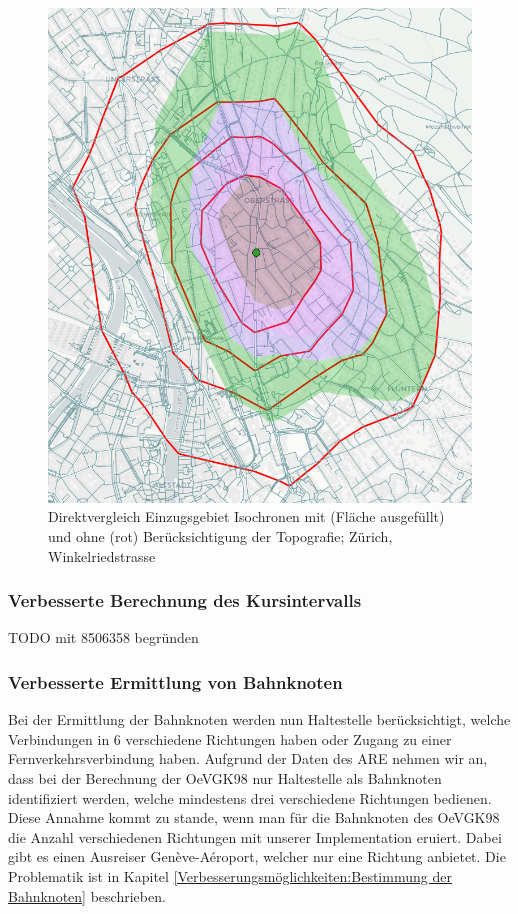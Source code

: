 \begin{figure}[ht]
    \centering
    \includegraphics[width=0.8\linewidth]{technicalreport/img/vergleich_wegfuehrung_isochrone_mit_ohne_topo.png}
    \caption[Direktvergleich Einzugsgebiet Isochronen mit und ohne Topografie]{Direktvergleich Einzugsgebiet Isochronen mit (Fläche ausgefüllt) und ohne (rot) Berücksichtigung der Topografie; Zürich, Winkelriedstrasse}
    \label{fig:vergleich_wegfuehrung_isochrone_mit_ohne_topo}
\end{figure}


\subsubsection{Verbesserte Berechnung des Kursintervalls}

TODO mit 8506358 begründen

\subsubsection{Verbesserte Ermittlung von Bahnknoten}
Bei der Ermittlung der Bahnknoten werden nun Haltestelle berücksichtigt, welche Verbindungen in 6 verschiedene Richtungen haben oder Zugang zu einer Fernverkehrsverbindung haben.
Aufgrund der Daten des \acl{ARE} nehmen wir an, dass bei der Berechnung der OeVGK98 nur Haltestelle als Bahnknoten identifiziert werden, welche mindestens drei verschiedene Richtungen bedienen.
Diese Annahme kommt zu stande, wenn man für die Bahnknoten des OeVGK98 die Anzahl verschiedenen Richtungen mit unserer Implementation eruiert.
Dabei gibt es einen Ausreiser Genève-Aéroport, welcher nur eine Richtung anbietet.
Die Problematik ist in Kapitel \ref{Verbesserungsmöglichkeiten:Bestimmung der Bahnknoten} beschrieben.

